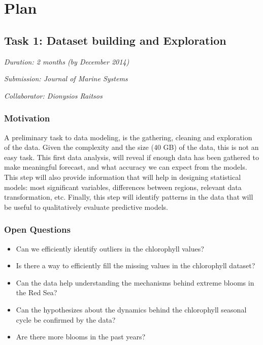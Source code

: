 

\chapter{Plan}
\label{chapter3}

\section{Task 1: Dataset building and Exploration}

\noindent
\emph{Duration: 2 months (by December 2014)}

\noindent
\emph{Submission: Journal of Marine Systems}

\noindent
\emph{Collaborator: Dionysios Raitsos}

\subsection{Motivation}

A preliminary task to data modeling, is the gathering, cleaning and exploration of the data. Given the complexity and the size (40 GB) of the data, this is not an easy task. This first data analysis, will reveal if enough data has been gathered to make meaningful forecast, and what accuracy we can expect from the models. This step will also provide information that will help in designing statistical models: most significant variables, differences between regions, relevant data transformation, etc. Finally, this step will identify patterns in the data that will be useful to qualitatively evaluate predictive models.

\subsection{Open Questions}

\begin{itemize}
\item Can we efficiently identify outliers in the chlorophyll values?
\item Is there a way to efficiently fill the missing values in the chlorophyll dataset?
\item Can the data help understanding the mechanisms behind extreme blooms in the Red Sea?
\item Can the hypothesizes about the dynamics behind the chlorophyll seasonal cycle be confirmed by the data?
\item Are there more blooms in the past years?
\end{itemize}

